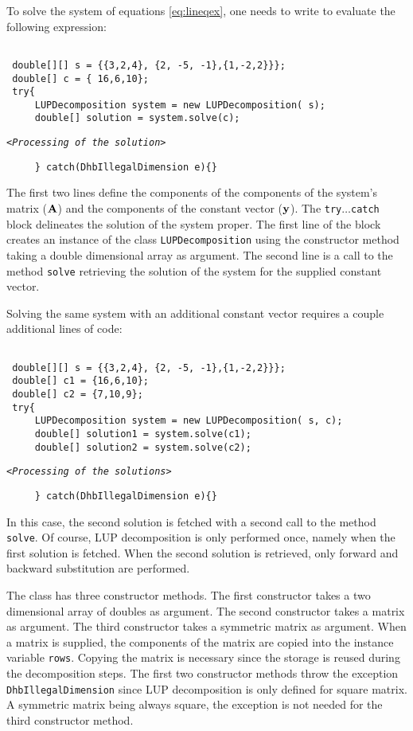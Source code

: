 \documentclass[twoside]{book}
\begin{document}
To solve the system of equations \ref{eq:lineqex}, one needs to
write to evaluate the following expression:
\begin{codeExample}
\begin{verbatim}

 double[][] s = {{3,2,4}, {2, -5, -1},{1,-2,2}}};
 double[] c = { 16,6,10};
 try{
     LUPDecomposition system = new LUPDecomposition( s);
     double[] solution = system.solve(c);
\end{verbatim}
\hfil{\tt<\sl Processing of the solution\tt>}\hfil
\begin{verbatim}
     } catch(DhbIllegalDimension e){}
\end{verbatim}
\end{codeExample}
The first two lines define the components of the components of the
system's matrix (${\bf A}$) and the components of the constant
vector (${\bf y}$). The {\tt try$\ldots$catch} block delineates
the solution of the system proper. The first line of the block
creates an instance of the class {\tt LUPDecomposition} using the
constructor method taking a double dimensional array as argument.
The second line is a call to the method {\tt solve} retrieving the
solution of the system for the supplied constant vector.

Solving the same system with an additional constant vector
requires a couple additional lines of code:
\begin{codeExample}
\begin{verbatim}

 double[][] s = {{3,2,4}, {2, -5, -1},{1,-2,2}}};
 double[] c1 = {16,6,10};
 double[] c2 = {7,10,9};
 try{
     LUPDecomposition system = new LUPDecomposition( s, c);
     double[] solution1 = system.solve(c1);
     double[] solution2 = system.solve(c2);
\end{verbatim}
\hfil{\tt<\sl Processing of the solutions\tt>}\hfil
\begin{verbatim}
     } catch(DhbIllegalDimension e){}
\end{verbatim}
\end{codeExample}
In this case, the second solution is fetched with a second call to
the method {\tt solve}. Of course, LUP decomposition is only
performed once, namely when the first solution is fetched. When
the second solution is retrieved, only forward and backward
substitution are performed.

The class has three constructor methods. The first constructor
takes a two dimensional array of doubles as argument. The second
constructor takes a matrix as argument. The third constructor
takes a symmetric matrix as argument. When a matrix is supplied,
the components of the matrix are copied into the instance variable
{\tt rows}. Copying the matrix is necessary since the storage is
reused during the decomposition steps. The first two constructor
methods throw the exception {\tt DhbIllegalDimension} since LUP
decomposition is only defined for square matrix. A symmetric
matrix being always square, the exception is not needed for the
third constructor method.
\end{document}
